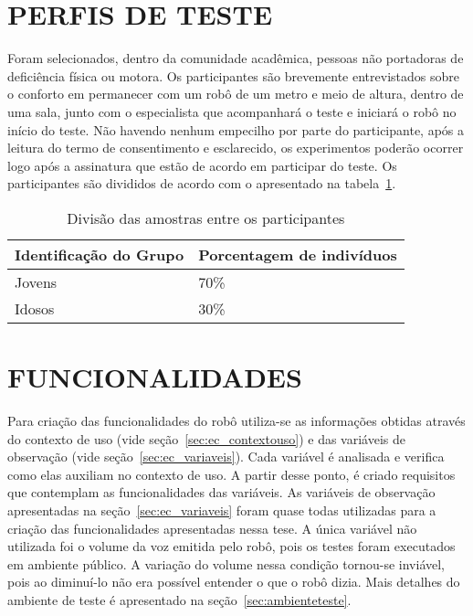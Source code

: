 \section{PERFIS DE TESTE}
\label{sec:ec_perfisteste}
Foram selecionados, dentro da comunidade acadêmica, pessoas não portadoras de deficiência física ou motora. Os participantes são brevemente entrevistados sobre o conforto em permanecer com um robô de um metro e meio de altura, dentro de uma sala, junto com o especialista que acompanhará o teste e iniciará o robô no início do teste. Não havendo nenhum empecilho por parte do participante, após a leitura do termo de consentimento e esclarecido, os experimentos poderão ocorrer logo após a assinatura que estão de acordo em participar do teste. Os participantes são divididos de acordo com o apresentado na tabela~\ref{tab:amostra}.

\begin{table}[ht]
  \caption{Divisão das amostras entre os participantes}
  \begin{center}
      \begin{tabular}{l | l}
      \hline
      Identificação do Grupo  & Porcentagem de indivíduos \\
      \hline
      Jovens   & 70\% \\
      Idosos   & 30\% \\
      \hline
      \end{tabular}
  \end{center}
  \label{tab:amostra}
\end{table} 

\section{FUNCIONALIDADES}
\label{sec:ec_funcionalidades}
Para criação das funcionalidades do robô utiliza-se as informações obtidas através do contexto de uso (vide seção~\ref{sec:ec_contextouso}) e das variáveis de observação (vide seção~\ref{sec:ec_variaveis}). Cada variável é analisada e verifica como elas auxiliam no contexto de uso. A partir desse ponto, é criado requisitos que contemplam as funcionalidades das variáveis. As variáveis de observação apresentadas na seção~\ref{sec:ec_variaveis} foram quase todas utilizadas para a criação das funcionalidades apresentadas nessa tese. A única variável não utilizada foi o volume da voz emitida pelo robô, pois os testes foram executados em ambiente público. A variação do volume nessa condição tornou-se inviável, pois ao diminuí-lo não era possível entender o que o robô dizia. Mais detalhes do ambiente de teste é apresentado na seção~\ref{sec:ambienteteste}.

